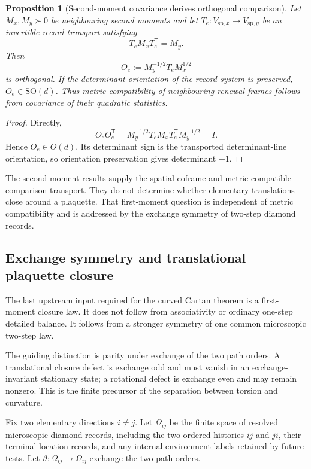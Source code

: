 \documentclass[11pt]{article}
\newtheorem{proposition}[theorem]{Proposition}
\theoremstyle{definition}
\theoremstyle{remark}
\newcommand{\SO}{\mathrm{SO}}
\newcommand{\spat}{\mathrm{sp}}
\begin{document}
\begin{proposition}[Second-moment covariance derives orthogonal comparison]
\label{prop:metric-comparison}
Let $M_x,M_y\succ0$ be neighbouring second moments and let
$T_e:V_{\spat,x}\to V_{\spat,y}$ be an invertible record transport satisfying
\[
 T_eM_xT_e^{\mathsf T}=M_y.
\]
Then
\[
 O_e:=M_y^{-1/2}T_eM_x^{1/2}
\]
is orthogonal.  If the determinant orientation of the record system is
preserved, $O_e\in\SO(d)$.  Thus metric compatibility of neighbouring renewal
frames follows from covariance of their quadratic statistics.
\end{proposition}

\begin{proof}
Directly,
\[
 O_eO_e^{\mathsf T}
 =M_y^{-1/2}T_eM_xT_e^{\mathsf T}M_y^{-1/2}=I.
\]
Hence $O_e\in O(d)$.  Its determinant sign is the transported determinant-line
orientation, so orientation preservation gives determinant $+1$.
\end{proof}

The second-moment results supply the spatial coframe and metric-compatible
comparison transport.  They do not determine whether elementary translations
close around a plaquette.  That first-moment question is independent of metric
compatibility and is addressed by the exchange symmetry of two-step diamond
records.

\subsection{Exchange symmetry and translational plaquette closure}

The last upstream input required for the curved Cartan theorem is a
first-moment closure law.  It does not follow from associativity or ordinary
one-step detailed balance.  It follows from a stronger symmetry of one common
microscopic two-step law.

The guiding distinction is parity under exchange of the two path orders.  A
translational closure defect is exchange odd and must vanish in an
exchange-invariant stationary state; a rotational defect is exchange even and may
remain nonzero.  This is the finite precursor of the separation between torsion
and curvature.

Fix two elementary directions $i\ne j$.  Let $\Omega_{ij}$ be the finite space
of resolved microscopic diamond records, including the two ordered histories
$ij$ and $ji$, their terminal-location records, and any internal environment
labels retained by future tests.  Let
$\vartheta:\Omega_{ij}\to\Omega_{ij}$ exchange the two path orders.
\end{document}
